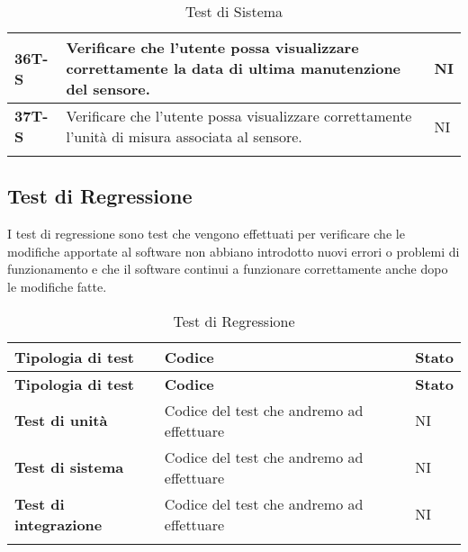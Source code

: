 \begin{longtable}{|>{\raggedright\arraybackslash}m{}|>{\raggedright\arraybackslash}m{}|>{\raggedright\arraybackslash}m{}|}
	\hline
	\textbf{36T-S}  & Verificare che l’utente possa visualizzare correttamente la data di ultima manutenzione del sensore.                                                                               & NI             \\
	\hline
	\textbf{37T-S}  & Verificare che l’utente possa visualizzare correttamente l’unità di misura associata al sensore.                                                                                   & NI             \\
	\hline
	\caption{Test di Sistema}
\end{longtable}

\subsection{Test di Regressione}
I test di regressione sono test che vengono effettuati per verificare che le modifiche apportate al software non abbiano introdotto nuovi errori o problemi di funzionamento e che il software continui a funzionare correttamente anche dopo le modifiche fatte. \\
\begin{longtable}{|>{\raggedright\arraybackslash}m{}|>{\raggedright\arraybackslash}m{}|>{\raggedright\arraybackslash}m{}|}
	\hline
	\textbf{Tipologia di test}    & \textbf{Codice}                           & \textbf{Stato} \\
	\hline
	\endfirsthead
	\hline
	\textbf{Tipologia di test}    & \textbf{Codice}                           & \textbf{Stato} \\
	\endhead
	\textbf{Test di unità}        & Codice del test che andremo ad effettuare & NI             \\
	\hline
	\textbf{Test di sistema}      & Codice del test che andremo ad effettuare & NI             \\
	\hline
	\textbf{Test di integrazione} & Codice del test che andremo ad effettuare & NI             \\
	\hline
	\caption{Test di Regressione}
\end{longtable}
\newpage
